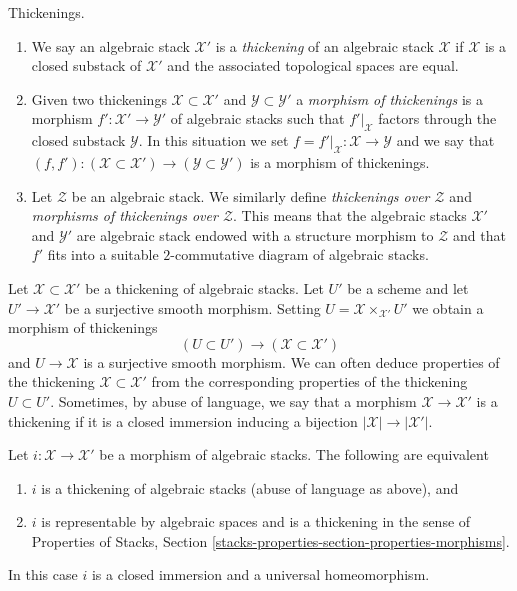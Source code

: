 \begin{definition}
\label{definition-thickening}
Thickenings.
\begin{enumerate}
\item We say an algebraic stack $\mathcal{X}'$ is a {\it thickening}
of an algebraic stack $\mathcal{X}$ if $\mathcal{X}$ is a closed substack
of $\mathcal{X}'$ and the associated topological spaces are equal.
\item Given two thickenings $\mathcal{X} \subset \mathcal{X}'$ and
$\mathcal{Y} \subset \mathcal{Y}'$ a {\it morphism of thickenings}
is a morphism $f' : \mathcal{X}' \to \mathcal{Y}'$ of algebraic stacks
such that $f'|_\mathcal{X}$ factors through the closed
substack $\mathcal{Y}$. In this situation we set
$f = f'|_\mathcal{X} : \mathcal{X} \to \mathcal{Y}$ and we say that
$(f, f') : (\mathcal{X} \subset \mathcal{X}') \to
(\mathcal{Y} \subset \mathcal{Y}')$ is a morphism of thickenings.
\item Let $\mathcal{Z}$ be an algebraic stack. We similarly define
{\it thickenings over $\mathcal{Z}$} and
{\it morphisms of thickenings over $\mathcal{Z}$}.
This means that the algebraic stacks
$\mathcal{X}'$ and $\mathcal{Y}'$
are algebraic stack endowed with a structure
morphism to $\mathcal{Z}$ and that $f'$ fits into a suitable
$2$-commutative diagram of algebraic stacks.
\end{enumerate}
\end{definition}

\noindent
Let $\mathcal{X} \subset \mathcal{X}'$ be a thickening of algebraic stacks.
Let $U'$ be a scheme and let $U' \to \mathcal{X}'$ be a surjective smooth
morphism. Setting $U = \mathcal{X} \times_{\mathcal{X}'} U'$ we obtain
a morphism of thickenings
$$
(U \subset U') \longrightarrow (\mathcal{X} \subset \mathcal{X}')
$$
and $U \to \mathcal{X}$ is a surjective smooth morphism. We can often
deduce properties of the thickening $\mathcal{X} \subset \mathcal{X}'$
from the corresponding properties of the thickening $U \subset U'$.
Sometimes, by abuse of language, we say that a morphism
$\mathcal{X} \to \mathcal{X}'$ is a thickening if it is a closed
immersion inducing a bijection $|\mathcal{X}| \to |\mathcal{X}'|$.

\begin{lemma}
\label{lemma-thickening}
Let $i : \mathcal{X} \to \mathcal{X}'$ be a morphism of algebraic stacks.
The following are equivalent
\begin{enumerate}
\item $i$ is a thickening of algebraic stacks (abuse of language as above), and
\item $i$ is representable by algebraic spaces and
is a thickening in the sense of Properties of Stacks, Section
\ref{stacks-properties-section-properties-morphisms}.
\end{enumerate}
In this case $i$ is a closed immersion and a universal homeomorphism.
\end{lemma}

